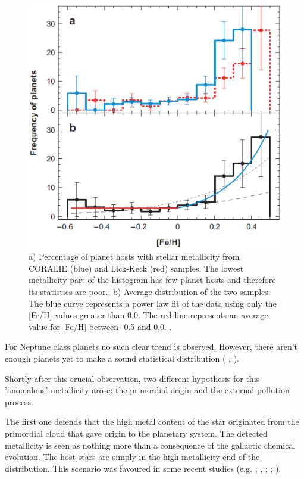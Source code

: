 \documentclass[dvips,12pt,a4paper]{report}
\begin{document}
\begin{figure}[h]
\centering
\includegraphics[trim=0cm 0.3cm 0cm 0.5cm,clip,height=10 cm]{pics/fehhist}
\caption[Histograms of Frequency of planets with metallicity ]{a) Percentage of planet hosts with stellar metallicity from CORALIE (blue) and Lick-Keck (red) samples. The lowest metallicity part of the histogram has few planet hosts and therefore its statistics are poor.; b) Average distribution of the two samples. The blue curve represents a power law fit of the data using only the [Fe/H] values greater than 0.0. The red line represents an average value for [Fe/H] between -0.5 and 0.0. \citep{Udry-2007}.}
\label{histfeh}
\end{figure}

For Neptune class planets no such clear trend is observed. However, there aren't enough planets yet to make a sound statistical distribution (\citeauthor{Udry-2006} \citeyear{Udry-2006}, \citeauthor{Sousa-2008} \citeyear{Sousa-2008}).

Shortly after this crucial observation, two different hypothesis for this 'anomalous' metallicity arose: the primordial origin and the external pollution process.

The first one defends that the high metal content of the star originated from the primordial cloud that gave origin to the planetary system. The detected metallicity is seen as nothing more than a consequence of the gallactic chemical evolution. The host stars are simply in the high metallicity end of the distribution. This scenario was favoured in some recent studies (e.g. \citeauthor{Sadakane-2002} \citeyear{Sadakane-2002}; \citeauthor{Santos-2003} \citeyear{Santos-2003}, \citeyear{Santos-2005a}; \citeauthor{Fischer-2005} \citeyear{Fischer-2005}; \citeauthor{Ecuvillon-2006b} \citeyear{Ecuvillon-2006b}).
\end{document}
